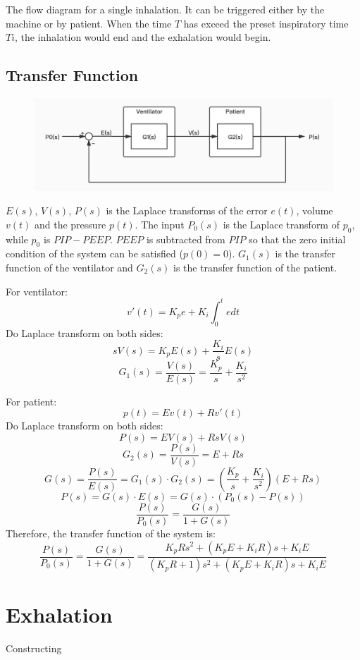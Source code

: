 \documentclass{article}
\begin{document}
The flow diagram for a single inhalation. It can be triggered either by the machine or by patient. When the time $T$ has exceed the preset inspiratory time $Ti$, the inhalation would end and the exhalation would begin.

\newpage

\subsection{Transfer Function}
\begin{figure}[h]
\centering
\includegraphics[scale=0.3]{block-diagram.jpg}
\end{figure}

$E(s)$, $V(s)$, $P(s)$ is the Laplace transforms of the error $e(t)$, volume $v(t)$ and the pressure $p(t)$. The input $P_{0}(s)$ is the Laplace transform of $p_{0}$, while $p_{0}$ is $PIP-PEEP$. $PEEP$ is subtracted from $PIP$ so that the zero initial condition of the system can be satisfied ($p(0)=0$). $G_1(s)$ is the transfer function of the ventilator and $G_2(s)$ is the transfer function of the patient.

For ventilator:
$$v'(t)=K_pe+K_i\int _0^tedt$$
Do Laplace transform on both sides:
$$sV(s)=K_pE(s)+\frac{K_i}{s}E(s)$$
$$G_1(s)=\frac{V(s)}{E(s)}=\frac{K_p}{s}+\frac{K_i}{s^2}$$

For patient:
$$p(t)=Ev(t)+Rv'(t)$$
Do Laplace transform on both sides:
$$P(s)=EV(s)+RsV(s)$$
$$G_2(s)=\frac{P(s)}{V(s)}=E+Rs$$
$$G(s)=\frac{P(s)}{E(s)}=G_1(s)\cdot G_2(s)=(\frac{K_p}{s}+\frac{K_i}{s^2})(E+Rs)$$
$$P(s)=G(s)\cdot E(s)=G(s)\cdot (P_0(s)-P(s))$$
$$\frac{P(s)}{P_0(s)}=\frac{G(s)}{1+G(s)}$$
Therefore, the transfer function of the system is:
$$\frac{P(s)}{P_0(s)}=\frac{G(s)}{1+G(s)}=\frac{K_pRs^2+(K_pE+K_iR)s+K_iE}{(K_pR+1)s^2+(K_pE+K_iR)s+K_iE}$$

\section{Exhalation}
Constructing
\end{document}
